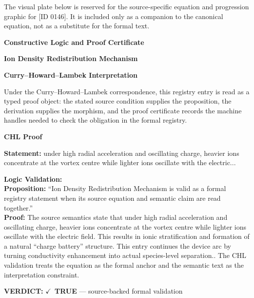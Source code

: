 \begingroup\footnotesize\sloppy
The visual plate below is reserved for the source-specific equation and progression graphic for [ID 0146]. It is included only as a companion to the canonical equation, not as a substitute for the formal text.
\par\endgroup
\ifTZPDarkEdition
{}
\fi

\clearpage
\begingroup\tzpsupportsetup
\noindent\textbf{\fontsize{10.8pt}{12.8pt}\selectfont [ID 0146] Constructive Logic and Proof Certificate}\par
\noindent\textbf{\fontsize{10pt}{12pt}\selectfont Ion Density Redistribution Mechanism}\par
\vspace{0.45em}
\begingroup
\footnotesize
\setlength{\parskip}{0.22em}
\setlength{\parindent}{0pt}
\noindent\textbf{Curry--Howard--Lambek Interpretation}\par
Under the Curry--Howard--Lambek correspondence, this registry entry is read as a typed proof
object: the stated source condition supplies the proposition, the derivation supplies the
morphism, and the proof certificate records the machine handles needed to check the obligation
in the formal registry.

\vspace{0.45em}
\noindent\textbf{CHL Proof}\par
\textbf{Statement:} under high radial acceleration and oscillating charge, heavier ions concentrate at the
vortex centre while lighter ions oscillate with the electric...

\textbf{Logic Validation:}\\
\textbf{Proposition:} ``Ion Density Redistribution Mechanism is valid as a formal registry statement when its
source equation and semantic claim are read together.''\\
\textbf{Proof:} The source semantics state that under high radial acceleration and oscillating charge,
heavier ions concentrate at the vortex centre while lighter ions oscillate with the
electric field. This results in ionic stratification and formation of a natural ``charge
battery'' structure. This entry continues the device arc by turning conductivity
enhancement into actual species-level separation.. The CHL validation treats the
equation as the formal anchor and the semantic text as the interpretation constraint.

\textbf{VERDICT:} \ensuremath{\checkmark}\ \textbf{TRUE} --- source-backed formal validation

